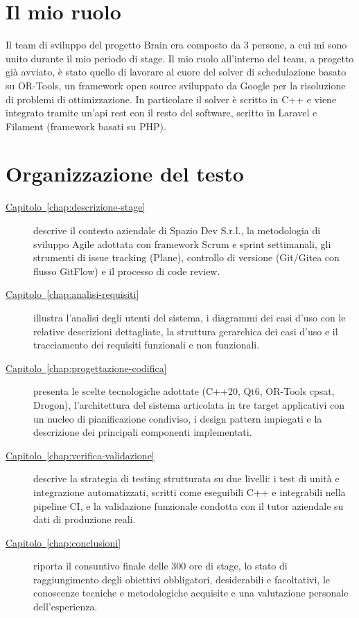 \section{Il mio ruolo}
Il team di sviluppo del progetto Brain era composto da 3 persone, a cui mi sono unito durante il mio periodo di stage. Il mio ruolo all'interno del team, a progetto 
già avviato, è stato quello di lavorare al cuore del \gls{solver} di schedulazione basato su OR-Tools, un framework open source sviluppato da Google per la risoluzione di problemi di ottimizzazione.
In particolare il solver è scritto in C++ e viene integrato tramite un'\gls{api} \gls{rest} con il resto del software, scritto in Laravel e Filament (framework basati su PHP).

\section{Organizzazione del testo}
\begin{description}
    \item[{\hyperref[chap:descrizione-stage]{Capitolo~\ref*{chap:descrizione-stage}}}] descrive il contesto aziendale di Spazio Dev S.r.l., la metodologia di sviluppo Agile adottata con framework Scrum e sprint settimanali, gli strumenti di issue tracking (Plane), controllo di versione (Git/Gitea con flusso GitFlow) e il processo di code review.

    \item[{\hyperref[chap:analisi-requisiti]{Capitolo~\ref*{chap:analisi-requisiti}}}] illustra l'analisi degli utenti del sistema, i diagrammi dei casi d'uso con le relative descrizioni dettagliate, la struttura gerarchica dei casi d'uso e il tracciamento dei requisiti funzionali e non funzionali.

    \item[{\hyperref[chap:progettazione-codifica]{Capitolo~\ref*{chap:progettazione-codifica}}}] presenta le scelte tecnologiche adottate (C++20, Qt6, OR-Tools \gls{cpsat}, Drogon), l'architettura del sistema articolata in tre target applicativi con un nucleo di pianificazione condiviso, i design pattern impiegati e la descrizione dei principali componenti implementati.

    \item[{\hyperref[chap:verifica-validazione]{Capitolo~\ref*{chap:verifica-validazione}}}] descrive la strategia di testing strutturata su due livelli: i test di unità e integrazione automatizzati, scritti come eseguibili C++ e integrabili nella pipeline CI, e la validazione funzionale condotta con il tutor aziendale su dati di produzione reali.

    \item[{\hyperref[chap:conclusioni]{Capitolo~\ref*{chap:conclusioni}}}] riporta il consuntivo finale delle 300 ore di stage, lo stato di raggiungimento degli obiettivi obbligatori, desiderabili e facoltativi, le conoscenze tecniche e metodologiche acquisite e una valutazione personale dell'esperienza.
\end{description}

